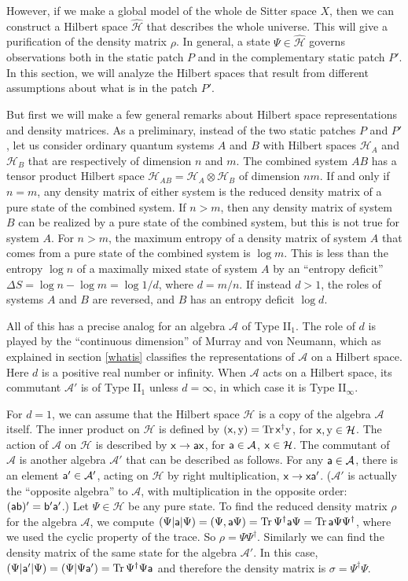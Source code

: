 \documentclass[11pt,a4paper]{article}
\def\a{{\sf a}}
\def\b{{\sf b}}
\def\x{{\sf x}}
\def\y{{\sf y}}
\def\h{\widehat}
\def\y{{\mathrm y}}
\def\A{{\mathcal A}}
\def\b{\overline}
\def\h{\widehat}
\def\H{{\mathcal H}}
\def\Tr{{\mathrm{Tr}}}
\def\b{{\sf b}}
\begin{document}
However, if we make a global model of the whole de Sitter space $X$, then we can construct a Hilbert space $\h\H$ that describes the whole universe. This
will give a purification of the density matrix $\rho$.    In general, a
state $\Psi\in\h\H$ governs observations both in the static patch $P$ and in the complementary static patch $P'$.    In this section, we will analyze the Hilbert
spaces that result from different assumptions about what is in the patch $P'$.


But first we will make a few general remarks about Hilbert space representations and density matrices.
As a preliminary, instead of the two static patches $P$ and $P'$, let us consider
ordinary quantum systems $A$ and $B$ with Hilbert spaces $\H_A$ and $\H_B$ that are respectively of dimension $n$ and $m$.   The combined system $AB$ has a tensor
product Hilbert space $\H_{AB}=\H_A\otimes \H_B$ of dimension $nm$.   If and only if $n=m$, any density matrix of either system is the reduced density matrix
of a pure state of the combined system.
  If $n>m$, then any density matrix of system $B$ can be realized by a pure
state of the combined system, but this is not true for system $A$.    For $n>m$, the maximum entropy of a density matrix of system $A$ that comes from a pure
state of the combined system is $\log m$.   This is less than the entropy $\log n$ of a maximally mixed state of system $A$ by an ``entropy deficit''  $\Delta S
=\log n-\log m=\log 1/d$, where $d=m/n$.   If instead $d>1$, the roles of systems $A$ and $B$ are reversed, and $B$ has an entropy deficit $\log d$.

All of this has a precise analog for an algebra $\A$ of Type II$_1$.   The role of $d$ is played by the ``continuous dimension'' of Murray and von Neumann,
which as explained in section \ref{whatis} classifies the representations of  $\A$ on a Hilbert space.  Here $d$ is a positive real number or infinity.
When $\A$ acts on a Hilbert space, its commutant
 $\A'$ 
is of Type II$_1$ unless $d=\infty$, in which case it is Type II$_\infty$.  

For $d=1$, we can assume that the Hilbert space $\H$ is a copy of the algebra $\A$ itself.   The inner product on $\H$ is defined by
$(\x,\y)=\Tr\, \x^\dagger\y$, for $\x,\y\in\H$.   The action of $\A$ on $\H$ is described by $\x\to \a\x$, for $\a\in\A$, $\x\in\H$.   The commutant of $\A$ is
another algebra $\A'$ that can be described as follows.  For any $\a\in\A$, there is an element $\a'\in\A'$, acting on $\H$ by right multiplication,
$\x\to \x\a'$.   ($\A'$ is actually the ``opposite algebra'' to $\A$, with multiplication in the opposite order: $(\a\b)'=\b'\a'$.)  
Let $\Psi\in\H$ be any pure state.   To find the reduced density matrix $\rho$ for the algebra $\A$, we compute
$(\Psi|\a|\Psi)=(\Psi,\a\Psi)=\Tr\,\Psi^\dagger \a\Psi=\Tr\,\a\Psi\Psi^\dagger$, where we used the cyclic property of the trace.   So $\rho=\Psi\Psi^\dagger$.
Similarly we can find the density matrix of the same state for the algebra $\A'$.   In this case, $(\Psi|\a'|\Psi)=(\Psi|\Psi\a')=\Tr\,\Psi^\dagger \Psi\a$
and therefore the density matrix is $\sigma=\Psi^\dagger\Psi$.
\end{document}
